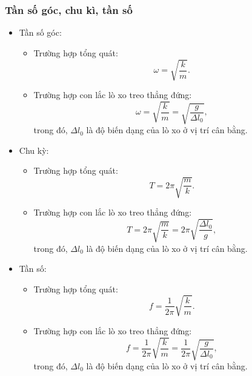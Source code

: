 \subsubsection{Tần số góc, chu kì, tần số}
\begin{itemize}
	\item Tần số góc:
	\begin{itemize}
		\item Trường hợp tổng quát: \begin{equation*} \omega = \sqrt {\dfrac {k}{m}}. \end{equation*}
		\item Trường hợp con lắc lò xo treo thẳng đứng: \begin{equation*}\omega = \sqrt {\dfrac {k}{m}}=\sqrt {\dfrac {g}{\Delta l_0}}, \end{equation*}
		trong đó, $\Delta l_0$ là độ biến dạng của lò xo ở vị trí cân bằng.
	\end{itemize}
	
	\item Chu kỳ:
	\begin{itemize}
		\item Trường hợp tổng quát: \begin{equation*} T = 2 \pi \sqrt {\dfrac{m}{k}}. \end{equation*}
		\item Trường hợp con lắc lò xo treo thẳng đứng: \begin{equation*} T= 2 \pi \sqrt {\dfrac{m}{k}}=2\pi \sqrt {\dfrac{\Delta l_0}{g}},	\end{equation*}
		trong đó, $\Delta l_0$ là độ biến dạng của lò xo ở vị trí cân bằng.
	\end{itemize}
	
	
	\item Tần số:
	\begin{itemize}
		\item Trường hợp tổng quát: \begin{equation*} f = \dfrac{1}{2 \pi} \sqrt {\dfrac{k}{m}}. \end{equation*}
		\item Trường hợp con lắc lò xo treo thẳng đứng: \begin{equation*} f= \dfrac{1}{2 \pi} \sqrt {\dfrac{k}{m}}=\dfrac{1}{2 \pi} \sqrt {\dfrac{g}{\Delta l_0}},	\end{equation*}
		trong đó, $\Delta l_0$ là độ biến dạng của lò xo ở vị trí cân bằng.
	\end{itemize}
\end{itemize}

